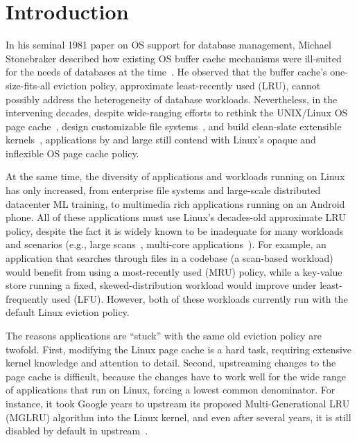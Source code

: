\section{Introduction}

In his seminal 1981 paper on OS support for database management, Michael Stonebraker described how existing OS buffer cache mechanisms were ill-suited for the needs of databases at the time~\cite{stonebraker_support}. He observed that the buffer cache's one-size-fits-all eviction policy, approximate least-recently used (LRU), cannot possibly address the heterogeneity of database workloads. Nevertheless, in the intervening decades, despite wide-ranging efforts to rethink the UNIX/Linux OS page cache~\cite{parallel-page-cache,mglru,new-readahead}, design customizable file systems~\cite{kai-li-caching,kai-li-caching2,exokernel, bento}, and build clean-slate extensible kernels~\cite{VINO,VINO-2,SPIN}, applications by and large still contend with Linux's opaque and inflexible OS page cache policy. 

At the same time, the diversity of applications and workloads running on Linux has only increased, from enterprise file systems and large-scale distributed datacenter ML training, to multimedia rich applications running on an Android phone. All of these applications must use Linux's decades-old approximate LRU policy, despite the fact it is widely known to be inadequate for many workloads and scenarios (e.g., large scans~\cite{LIRS,frequency-replacement,LRU-K}, multi-core applications~\cite{parallel-page-cache}).
For example, an application that searches through files in a codebase (a scan-based workload) would benefit from using a most-recently used (MRU) policy, while a key-value store running a fixed, skewed-distribution workload would improve under least-frequently used (LFU). However, both of these workloads currently run with the default Linux eviction policy.

The reasons applications are ``stuck'' with the same old eviction policy are twofold. First, modifying the Linux page cache is a hard task, requiring extensive kernel knowledge and attention to detail. Second, upstreaming changes to the page cache is difficult, %
because the changes have to work well for the wide range of applications that run on Linux, forcing a lowest common denominator. For instance, it took Google years to upstream its proposed Multi-Generational LRU (MGLRU) algorithm into the Linux kernel, and even after several years, it is still disabled by default in upstream~\cite{mglru,mglru2}.

